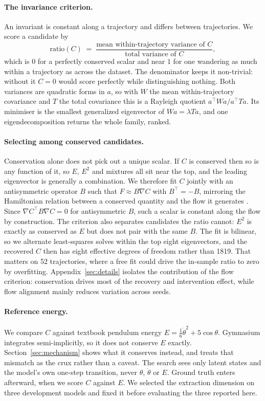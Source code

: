 \paragraph{The invariance criterion.} An invariant is constant along a trajectory and differs between
trajectories. We score a candidate by
\begin{equation}
\text{ratio}(C) \;=\;
\frac{\text{mean within-trajectory variance of } C}{\text{total variance of } C},
\label{eq:ratio}
\end{equation}
which is $0$ for a perfectly conserved scalar and near $1$ for one wandering as much within a
trajectory as across the dataset. The denominator keeps it non-trivial: without it $C=0$ would score
perfectly while distinguishing nothing. Both variances are quadratic forms in $a$, so with $W$ the
mean within-trajectory covariance and $T$ the total covariance this is a Rayleigh quotient
$a^\top W a / a^\top T a$. Its minimiser is the smallest generalized eigenvector of
$W a = \lambda T a$, and one eigendecomposition returns the whole family, ranked.

\paragraph{Selecting among conserved candidates.} Conservation alone does not pick out a unique
scalar. If $C$ is conserved then so is any function of it, so $E$, $E^2$ and mixtures all sit near
the top, and the leading eigenvector is generally a combination. We therefore fit $C$ jointly with an
antisymmetric operator $B$ such that $F \approx B\nabla C$ with $B^\top = -B$, mirroring the
Hamiltonian relation between a conserved quantity and the flow it generates
\citep{arnold1989mathematical}. Since $\nabla C^\top B\nabla C = 0$ for antisymmetric $B$, such a
scalar is constant along the flow by construction. The criterion also separates candidates the ratio
cannot: $E^2$ is exactly as conserved as $E$ but does not pair with the same $B$. The fit is
bilinear, so we alternate least-squares solves within the top eight eigenvectors, and the recovered
$C$ then has eight effective degrees of freedom rather than 1819. That matters on 52 trajectories,
where a free fit could drive the in-sample ratio to zero by overfitting. Appendix~\ref{sec:details}
isolates the contribution of the flow criterion: conservation drives most of the recovery and
intervention effect, while flow alignment mainly reduces variation across seeds.

\paragraph{Reference energy.} We compare $C$ against textbook pendulum energy
$E = \tfrac{1}{6}\dot\theta^2 + 5\cos\theta$. Gymnasium integrates semi-implicitly, so it does not
conserve $E$ exactly. Section~\ref{sec:mechanism} shows what it conserves instead, and treats that
mismatch as the crux rather than a caveat. The search sees only latent states and the model's own
one-step transition, never $\theta$, $\dot\theta$ or $E$. Ground truth enters afterward, when we
score $C$ against $E$. We selected the extraction dimension on three development models and fixed it
before evaluating the three reported here.
